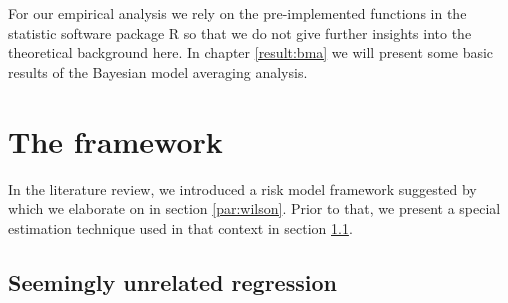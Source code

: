 \documentclass[a4paper, 12pt]{scrreprt}
\begin{document}
For our empirical analysis we rely on the pre-implemented functions in the statistic software package R so that we do not give further insights into the theoretical background here.
In chapter \ref{result:bma} we will present some basic results of the Bayesian model averaging analysis.


\section{The \textcite{wilson1997wilsonI} framework}\label{section:wilson}

In the literature review, we introduced a risk model framework suggested by \textcite{wilson1997wilsonI} which we elaborate on in section \ref{par:wilson}. Prior to that, we present a special estimation technique used in that context in section \ref{par:seemingly}. 

\subsection{Seemingly unrelated regression}\label{par:seemingly}
\end{document}
